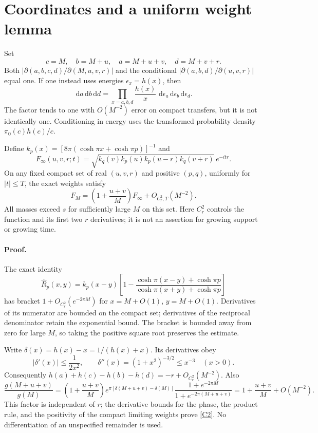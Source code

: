 \documentclass[11pt,a4paper]{article}
\newcommand{\Rh}{\widehat R}
\newcommand{\dd}{\,\mathrm d}
\begin{document}
\newpage
\section{Coordinates and a uniform weight lemma}
Set
\[
 c=M,\quad b=M+u,\quad a=M+u+v,\quad d=M+v+r.
\]
Both $|\partial(a,b,c,d)/\partial(M,u,v,r)|$ and the conditional
$|\partial(a,b,d)/\partial(u,v,r)|$ equal one.
If one instead uses energies $\epsilon_x=h(x)$, then
\[
 \dd a\dd b\dd d=
 \prod_{x=a,b,d}\frac{h(x)}{x}\,
 \dd\epsilon_a\dd\epsilon_b\dd\epsilon_d .
\]
The factor tends to one with $O(M^{-2})$ error on compact transfers,
but it is not identically one. Conditioning in energy uses the
transformed probability density $\pi_0(c)h(c)/c$.

Define $k_p(x)=[8\pi(\cosh\pi x+\cosh\pi p)]^{-1}$ and
\begin{equation}
 F_\infty(u,v,r;t)=
 \sqrt{k_q(v)k_p(u)k_p(u-r)k_q(v+r)}\,e^{-itr}.
 \label{limitweight}
\end{equation}
On any fixed compact set of real $(u,v,r)$ and positive $(p,q)$,
uniformly for $|t|\le T$, the exact weights satisfy
\begin{equation}
 F_M=\left(1+\frac{u+v}{M}\right)F_\infty
       +O_{C^2_r,T}(M^{-2}).                         \label{C2}
\end{equation}
All masses exceed $s$ for sufficiently large $M$ on this set.
Here $C^2_r$ controls the function and its first two $r$ derivatives;
it is not an assertion for growing support or growing time.

\paragraph{Proof.}
The exact identity
\[
 \Rh_p(x,y)=k_p(x-y)
 \left[1-\frac{\cosh\pi(x-y)+\cosh\pi p}
                  {\cosh\pi(x+y)+\cosh\pi p}\right]
\]
has bracket $1+O_{C^2_r}(e^{-2\pi M})$ for $x=M+O(1)$,
$y=M+O(1)$. Derivatives of its numerator are bounded on the compact
set; derivatives of the reciprocal denominator retain the exponential
bound. The bracket is bounded away from zero for large $M$, so taking
the positive square root preserves the estimate.

Write $\delta(x)=h(x)-x=1/(h(x)+x)$. Its derivatives obey
\[
 |\delta'(x)|\le\frac1{2x^2},\qquad
 \delta''(x)=(1+x^2)^{-3/2}\le x^{-3}\quad(x>0).
\]
Consequently
$h(a)+h(c)-h(b)-h(d)=-r+O_{C^2_r}(M^{-2})$.
Also
\[
 \frac{g(M+u+v)}{g(M)}
 =\left(1+\frac{u+v}{M}\right)
 e^{\pi[\delta(M+u+v)-\delta(M)]}
 \frac{1+e^{-2\pi M}}{1+e^{-2\pi(M+u+v)}}
 =1+\frac{u+v}{M}+O(M^{-2}).
\]
This factor is independent of $r$; the derivative bounds for the phase,
the product rule, and the positivity of the compact limiting weights
prove \eqref{C2}. No differentiation of an unspecified remainder is used.
\end{document}
